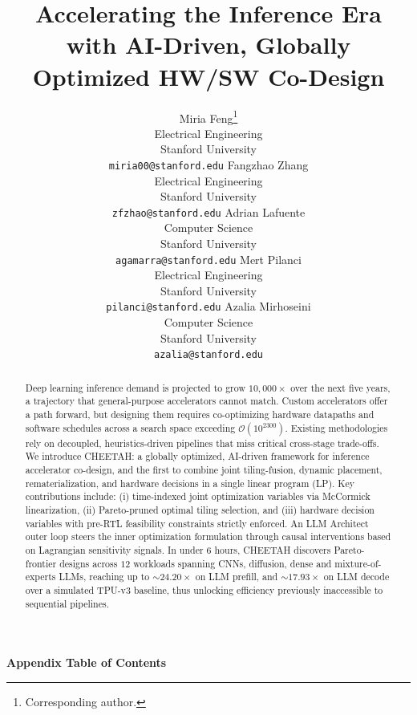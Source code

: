 \documentclass{article}
\title{Accelerating the Inference Era with AI-Driven, Globally Optimized HW/SW Co-Design}
\author{%
    Miria Feng\thanks{Corresponding author.} \\
    Electrical Engineering \\
    Stanford University \\
    \texttt{miria00@stanford.edu}
    \And
    Fangzhao Zhang \\
    Electrical Engineering \\
    Stanford University \\
    \texttt{zfzhao@stanford.edu} 
    \And
    Adrian Lafuente \\
    Computer Science \\
    Stanford University \\
    \texttt{agamarra@stanford.edu}
    \And
    Mert Pilanci \\
    Electrical Engineering \\
    Stanford University \\
    \texttt{pilanci@stanford.edu}
    \And
    Azalia Mirhoseini \\
    Computer Science \\
    Stanford University \\
    \texttt{azalia@stanford.edu} }
\theoremstyle{plain} \newtheorem{theorem}{Theorem} \newtheorem{corollary}{Corollary} \newtheorem{definition}{Definition} \theoremstyle{remark} \newtheorem*{remark}{Remark}
\begin{document}
\maketitle


\begin{abstract}
Deep learning inference demand is projected to grow $10{,}000\times$ over the next five years, a trajectory that general-purpose accelerators cannot match.
Custom accelerators offer a path forward, but designing them requires co-optimizing hardware datapaths and software schedules across a search space exceeding $\mathcal O(10^{2300})$.
Existing methodologies rely on decoupled, heuristics-driven pipelines that miss critical cross-stage trade-offs.
We introduce \textsc{CHEETAH}: a globally optimized, AI-driven framework for inference accelerator co-design, and the first to combine joint tiling-fusion, dynamic placement, rematerialization, and hardware decisions in a single linear program (LP).
Key contributions include: (i) time-indexed joint optimization variables via McCormick linearization, (ii) Pareto-pruned optimal tiling selection, and (iii) hardware decision variables with pre-RTL feasibility constraints strictly enforced.
An LLM Architect outer loop steers the inner optimization formulation through causal interventions based on Lagrangian sensitivity signals.
In under 6 hours, \textsc{CHEETAH} discovers Pareto-frontier designs across $12$ workloads spanning CNNs, diffusion, dense and mixture-of-experts LLMs, reaching up to $\sim24.20\times$ on LLM prefill, and $\sim17.93\times$ on LLM decode over a simulated TPU-v3 baseline, thus unlocking efficiency previously inaccessible to sequential pipelines.
\end{abstract}



















\label{page:main-end}



\newpage
\appendix

\startcontents[appendix]
\begin{center}{\Large\textbf{Appendix Table of Contents}}\end{center}
\vspace{4pt}
\clearpage
\end{document}
